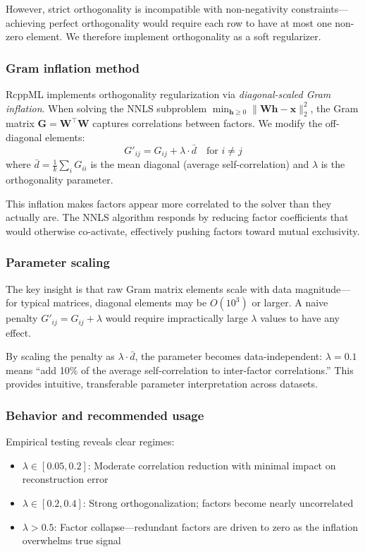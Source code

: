 \documentclass[article]{jss_modified}
\begin{document}
However, strict orthogonality is incompatible with non-negativity constraints---achieving 
perfect orthogonality would require each row to have at most one non-zero element.
We therefore implement orthogonality as a soft regularizer.

\subsubsection{Gram inflation method}

RcppML implements orthogonality regularization via \emph{diagonal-scaled Gram inflation}.
When solving the NNLS subproblem $\min_{\mathbf{h} \geq 0} \|\mathbf{W}\mathbf{h} - \mathbf{x}\|_2^2$,
the Gram matrix $\mathbf{G} = \mathbf{W}^\top\mathbf{W}$ captures correlations between factors.
We modify the off-diagonal elements:
\begin{equation}
  G'_{ij} = G_{ij} + \lambda \cdot \bar{d} \quad \text{for } i \neq j
\end{equation}
where $\bar{d} = \frac{1}{k}\sum_i G_{ii}$ is the mean diagonal (average self-correlation)
and $\lambda$ is the orthogonality parameter.

This inflation makes factors appear more correlated to the solver than they actually are.
The NNLS algorithm responds by reducing factor coefficients that would otherwise 
co-activate, effectively pushing factors toward mutual exclusivity.

\subsubsection{Parameter scaling}

The key insight is that raw Gram matrix elements scale with data magnitude---for 
typical matrices, diagonal elements may be $O(10^3)$ or larger. A naive penalty 
$G'_{ij} = G_{ij} + \lambda$ would require impractically large $\lambda$ values 
to have any effect.

By scaling the penalty as $\lambda \cdot \bar{d}$, the parameter becomes 
data-independent: $\lambda = 0.1$ means ``add 10\% of the average self-correlation 
to inter-factor correlations.'' This provides intuitive, transferable parameter 
interpretation across datasets.

\subsubsection{Behavior and recommended usage}

Empirical testing reveals clear regimes:
\begin{itemize}
  \item $\lambda \in [0.05, 0.2]$: Moderate correlation reduction with minimal impact on reconstruction error
  \item $\lambda \in [0.2, 0.4]$: Strong orthogonalization; factors become nearly uncorrelated
  \item $\lambda > 0.5$: Factor collapse---redundant factors are driven to zero as the inflation overwhelms true signal
\end{itemize}
\end{document}
